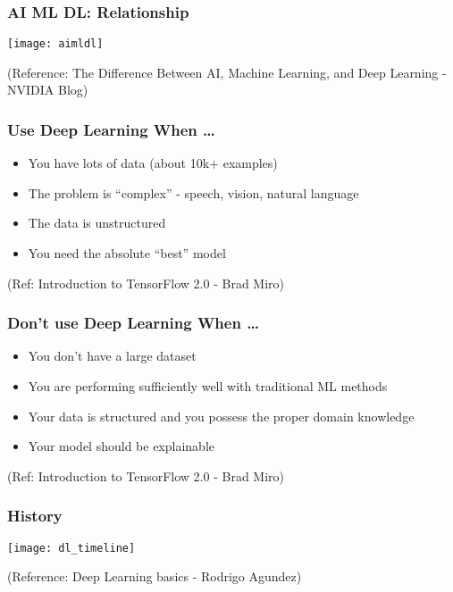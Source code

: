 \begin{frame}[fragile] \frametitle{AI ML DL: Relationship}
\begin{center}
\texttt{[image: aimldl]}
\end{center}

\tiny{(Reference: The Difference Between AI, Machine Learning, and Deep Learning - NVIDIA Blog)}
\end{frame}

\begin{frame}[fragile] \frametitle{Use Deep Learning When \ldots}

\begin{itemize}
\item You have lots of data (about 10k+ examples)
\item The problem is ``complex'' - speech, vision, natural language
\item The data is unstructured 
\item You need the absolute ``best'' model
\end{itemize}
\tiny{(Ref: Introduction to TensorFlow 2.0 - Brad Miro)}
\end{frame}

\begin{frame}[fragile] \frametitle{Don't use Deep Learning When \ldots}

\begin{itemize}
\item You don’t have a large dataset
\item You are performing sufficiently well with traditional ML methods
\item Your data is structured and you possess the proper domain knowledge
\item Your model should be explainable
\end{itemize}
\tiny{(Ref: Introduction to TensorFlow 2.0 - Brad Miro)}
\end{frame}

\begin{frame}[fragile] \frametitle{History}
\begin{center}
\texttt{[image: dl\_timeline]}
\end{center}

\tiny{(Reference: Deep Learning basics - Rodrigo Agundez)}
\end{frame}

